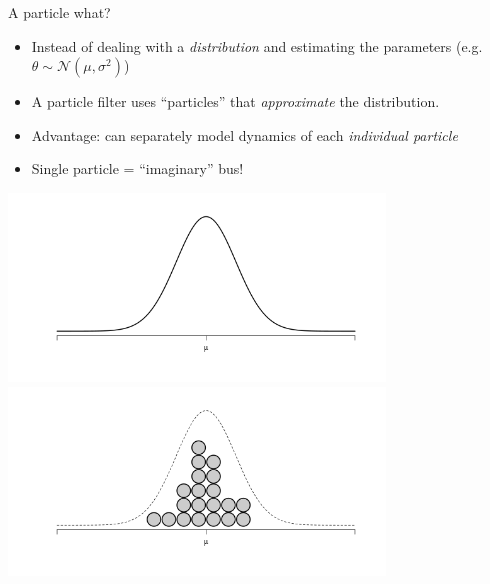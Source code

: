 \documentclass[10pt,t]{beamer}
\begin{document}
\begin{frame}{A particle what?}
  \begin{itemize}[<+->]
  \item[]
    Instead of dealing with a \emph{distribution} and estimating the parameters
    (e.g. $\theta \sim \mathcal{N}(\mu, \sigma^2)$)
    \vspace{1em}

  \item[]
    A particle filter uses ``particles'' that \emph{approximate} the distribution.
    \vspace{1em}
    
  \item[]
    Advantage: can separately model dynamics of each \emph{individual particle}

    \vspace{1em}
  \item[]
    Single particle = ``imaginary'' bus!

  \end{itemize}
  
  \vspace{-2cm}
  \begin{overprint}
    \includegraphics[width=10cm]{normal_dist.png}
    \includegraphics[width=10cm]{particle_dist.png}
  \end{overprint}
     
\end{frame}
\end{document}
